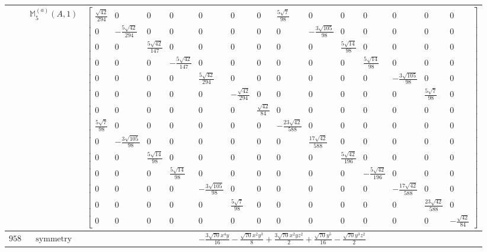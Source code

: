 \documentclass[fleqn,8pt,landscape]{jsarticle}
\begin{document}
\begin{longtable}{ccc}
$  $ & $ \mathbb{M}_{5}^{(a)}(A,1) $ & $ \begin{bmatrix} \frac{\sqrt{42}}{294} & 0 & 0 & 0 & 0 & 0 & 0 & \frac{5 \sqrt{7}}{98} & 0 & 0 & 0 & 0 & 0 & 0 \\ 0 & - \frac{5 \sqrt{42}}{294} & 0 & 0 & 0 & 0 & 0 & 0 & - \frac{3 \sqrt{105}}{98} & 0 & 0 & 0 & 0 & 0 \\ 0 & 0 & \frac{5 \sqrt{42}}{147} & 0 & 0 & 0 & 0 & 0 & 0 & \frac{5 \sqrt{14}}{98} & 0 & 0 & 0 & 0 \\ 0 & 0 & 0 & - \frac{5 \sqrt{42}}{147} & 0 & 0 & 0 & 0 & 0 & 0 & \frac{5 \sqrt{14}}{98} & 0 & 0 & 0 \\ 0 & 0 & 0 & 0 & \frac{5 \sqrt{42}}{294} & 0 & 0 & 0 & 0 & 0 & 0 & - \frac{3 \sqrt{105}}{98} & 0 & 0 \\ 0 & 0 & 0 & 0 & 0 & - \frac{\sqrt{42}}{294} & 0 & 0 & 0 & 0 & 0 & 0 & \frac{5 \sqrt{7}}{98} & 0 \\ 0 & 0 & 0 & 0 & 0 & 0 & \frac{\sqrt{42}}{84} & 0 & 0 & 0 & 0 & 0 & 0 & 0 \\ \frac{5 \sqrt{7}}{98} & 0 & 0 & 0 & 0 & 0 & 0 & - \frac{23 \sqrt{42}}{588} & 0 & 0 & 0 & 0 & 0 & 0 \\ 0 & - \frac{3 \sqrt{105}}{98} & 0 & 0 & 0 & 0 & 0 & 0 & \frac{17 \sqrt{42}}{588} & 0 & 0 & 0 & 0 & 0 \\ 0 & 0 & \frac{5 \sqrt{14}}{98} & 0 & 0 & 0 & 0 & 0 & 0 & \frac{5 \sqrt{42}}{196} & 0 & 0 & 0 & 0 \\ 0 & 0 & 0 & \frac{5 \sqrt{14}}{98} & 0 & 0 & 0 & 0 & 0 & 0 & - \frac{5 \sqrt{42}}{196} & 0 & 0 & 0 \\ 0 & 0 & 0 & 0 & - \frac{3 \sqrt{105}}{98} & 0 & 0 & 0 & 0 & 0 & 0 & - \frac{17 \sqrt{42}}{588} & 0 & 0 \\ 0 & 0 & 0 & 0 & 0 & \frac{5 \sqrt{7}}{98} & 0 & 0 & 0 & 0 & 0 & 0 & \frac{23 \sqrt{42}}{588} & 0 \\ 0 & 0 & 0 & 0 & 0 & 0 & 0 & 0 & 0 & 0 & 0 & 0 & 0 & - \frac{\sqrt{42}}{84} \end{bmatrix} $ \\ \hline
$ 958 $ & $ \text{symmetry} $ & $ - \frac{3 \sqrt{70} x^{4} y}{16} - \frac{\sqrt{70} x^{2} y^{3}}{8} + \frac{3 \sqrt{70} x^{2} y z^{2}}{2} + \frac{\sqrt{70} y^{5}}{16} - \frac{\sqrt{70} y^{3} z^{2}}{2} $ \\

\end{longtable}
\end{document}
